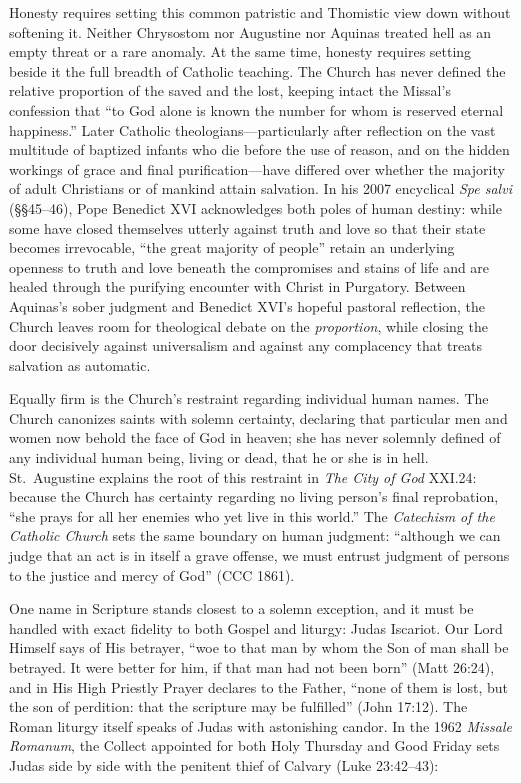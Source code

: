 Honesty requires setting this common patristic and Thomistic view down without softening it. Neither Chrysostom nor Augustine nor Aquinas treated hell as an empty threat or a rare anomaly. At the same time, honesty requires setting beside it the full breadth of Catholic teaching. The Church has never defined the relative proportion of the saved and the lost, keeping intact the Missal's confession that ``to God alone is known the number for whom is reserved eternal happiness.'' Later Catholic theologians---particularly after reflection on the vast multitude of baptized infants who die before the use of reason, and on the hidden workings of grace and final purification---have differed over whether the majority of adult Christians or of mankind attain salvation. In his 2007 encyclical \textit{Spe salvi} (\S\S 45--46), Pope Benedict XVI acknowledges both poles of human destiny: while some have closed themselves utterly against truth and love so that their state becomes irrevocable, ``the great majority of people'' retain an underlying openness to truth and love beneath the compromises and stains of life and are healed through the purifying encounter with Christ in Purgatory. Between Aquinas's sober judgment and Benedict XVI's hopeful pastoral reflection, the Church leaves room for theological debate on the \textit{proportion}, while closing the door decisively against universalism and against any complacency that treats salvation as automatic.

Equally firm is the Church's restraint regarding individual human names. The Church canonizes saints with solemn certainty, declaring that particular men and women now behold the face of God in heaven; she has never solemnly defined of any individual human being, living or dead, that he or she is in hell. St.\ Augustine explains the root of this restraint in \textit{The City of God} XXI.24: because the Church has certainty regarding no living person's final reprobation, ``she prays for all her enemies who yet live in this world.'' The \textit{Catechism of the Catholic Church} sets the same boundary on human judgment: ``although we can judge that an act is in itself a grave offense, we must entrust judgment of persons to the justice and mercy of God'' (CCC 1861).

One name in Scripture stands closest to a solemn exception, and it must be handled with exact fidelity to both Gospel and liturgy: Judas Iscariot. Our Lord Himself says of His betrayer, ``woe to that man by whom the Son of man shall be betrayed. It were better for him, if that man had not been born'' (Matt 26:24), and in His High Priestly Prayer declares to the Father, ``none of them is lost, but the son of perdition: that the scripture may be fulfilled'' (John 17:12). The Roman liturgy itself speaks of Judas with astonishing candor. In the 1962 \textit{Missale Romanum}, the Collect appointed for both Holy Thursday and Good Friday sets Judas side by side with the penitent thief of Calvary (Luke 23:42--43):

